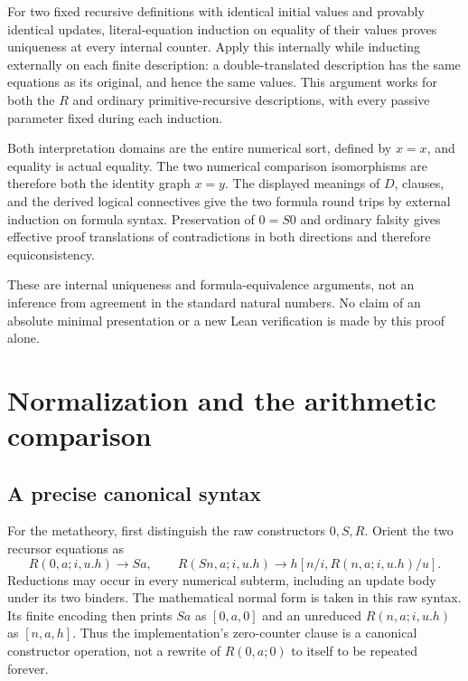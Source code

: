 \documentclass[11pt]{article}
\theoremstyle{definition}\newtheorem{definition}[theorem]{Definition}
\theoremstyle{remark}\newtheorem{remark}[theorem]{Remark}
\begin{document}
For two fixed recursive definitions with identical initial values and
provably identical updates, literal-equation induction on equality of their
values proves uniqueness at every internal counter.  Apply this internally
while inducting externally on each finite description: a double-translated
description has the same equations as its original, and hence the same
values.  This argument works for both the $R$ and ordinary primitive-recursive
descriptions, with every passive parameter fixed during each induction.

Both interpretation domains are the entire numerical sort, defined by
$x=x$, and equality is actual equality.  The two numerical comparison
isomorphisms are therefore both the identity graph $x=y$.  The displayed
meanings of $D$, clauses, and the derived logical connectives give the two
formula round trips by external induction on formula syntax.  Preservation
of $0=S0$ and ordinary falsity gives effective proof translations of
contradictions in both directions and therefore equiconsistency.

These are internal uniqueness and formula-equivalence arguments, not an
inference from agreement in the standard natural numbers.  No claim of an
absolute minimal presentation or a new Lean verification is made by this
proof alone.

\section{Normalization and the arithmetic comparison}
\label{sec:normalization}

\subsection{A precise canonical syntax}

For the metatheory, first distinguish the raw constructors $0,S,R$.
Orient the two recursor equations as
\[
 R(0,a;i,u.h)\longrightarrow Sa,\qquad
 R(Sn,a;i,u.h)\longrightarrow h[n/i,R(n,a;i,u.h)/u].
\]
Reductions may occur in every numerical subterm, including an update
body under its two binders. The mathematical normal form is taken in
this raw syntax. Its finite encoding then prints $Sa$ as $[0,a,0]$ and
an unreduced $R(n,a;i,u.h)$ as $[n,a,h]$. Thus the implementation's
zero-counter clause is a canonical constructor operation, not a rewrite
of $R(0,a;0)$ to itself to be repeated forever.
\end{document}
